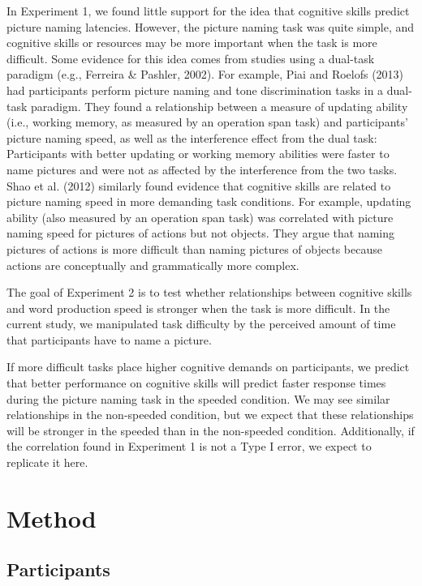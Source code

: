 \documentclass[
  man,floatsintext]{apa6}
\begin{document}
In Experiment 1, we found little support for the idea that cognitive skills predict picture naming latencies. However, the picture naming task was quite simple, and cognitive skills or resources may be more important when the task is more difficult. Some evidence for this idea comes from studies using a dual-task paradigm (e.g., Ferreira \& Pashler, 2002). For example, Piai and Roelofs (2013) had participants perform picture naming and tone discrimination tasks in a dual-task paradigm. They found a relationship between a measure of updating ability (i.e., working memory, as measured by an operation span task) and participants' picture naming speed, as well as the interference effect from the dual task: Participants with better updating or working memory abilities were faster to name pictures and were not as affected by the interference from the two tasks. Shao et al. (2012) similarly found evidence that cognitive skills are related to picture naming speed in more demanding task conditions. For example, updating ability (also measured by an operation span task) was correlated with picture naming speed for pictures of actions but not objects. They argue that naming pictures of actions is more difficult than naming pictures of objects because actions are conceptually and grammatically more complex.

The goal of Experiment 2 is to test whether relationships between cognitive skills and word production speed is stronger when the task is more difficult. In the current study, we manipulated task difficulty by the perceived amount of time that participants have to name a picture.

If more difficult tasks place higher cognitive demands on participants, we predict that better performance on cognitive skills will predict faster response times during the picture naming task in the speeded condition. We may see similar relationships in the non-speeded condition, but we expect that these relationships will be stronger in the speeded than in the non-speeded condition. Additionally, if the correlation found in Experiment 1 is not a Type I error, we expect to replicate it here.

\hypertarget{method-1}{%
\section{Method}\label{method-1}}

\hypertarget{participants-1}{%
\subsection{Participants}\label{participants-1}}
\end{document}
